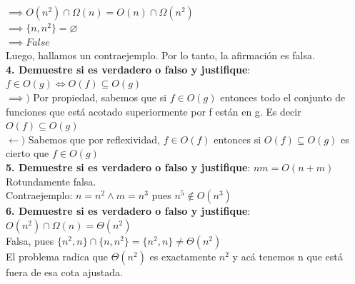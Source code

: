 \documentclass[10pt,a4paper]{article}
\begin{document}
$\implies O(n^{2}) \cap \Omega(n) = O(n) \cap \Omega(n^{2})$  \\
$\implies \{n, n^{2}\} = \varnothing$ \\
$\implies False$ \\
Luego, hallamos un contraejemplo. Por lo tanto, la afirmación es falsa. \\
\textbf{4. Demuestre si es verdadero o falso y justifique}: $f \in O(g) \iff O(f) \subseteq O(g)$ \\
$\implies)$ Por propiedad, sabemos que si $f \in O(g)$ entonces todo el conjunto de funciones que está acotado superiormente por f están en g. Es decir $O(f) \subseteq O(g)$ \\
$\leftarrow)$ Sabemos que por reflexividad, $f \in O(f)$ entonces si $O(f) \subseteq O(g)$ es cierto que $ f \in O(g)$ \\
\textbf{5. Demuestre si es verdadero o falso y justifique}: $nm = O(n+m)$ \\
Rotundamente falsa. \\
Contraejemplo: $n = n^{2} \land m = n^{3}$ pues $n^{5} \notin O(n^{3})$ \\
\textbf{6. Demuestre si es verdadero o falso y justifique}: $O(n^{2}) \cap \Omega(n) = \Theta(n^{2})$ \\
Falsa, pues $\{n^{2}, n\} \cap \{n, n^{2}\} = \{n^{2}, n\} \neq \Theta(n^{2}) $ \\
El problema radica que $\Theta(n^{2})$ es exactamente $n^{2}$ y acá tenemos n que está fuera de esa cota ajustada.
\end{document}
